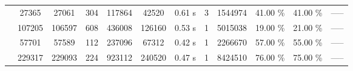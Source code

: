 \begin{table}[ht]
\begin{tabular}{ |c|c|c|c|c|c|c|c|c|c| }
 & 27365 & 27061 & 304 & 117864 & 42520 & 0.61 s & 3 & 1544974 & 41.00 \% & 41.00 \% & ----- \\
 & 107205 & 106597 & 608 & 436008 & 126160 & 0.53 s & 1 & 5015038 & 19.00 \% & 21.00 \% & ----- \\
 & 57701 & 57589 & 112 & 237096 & 67312 & 0.42 s & 1 & 2266670 & 57.00 \% & 55.00 \% & ----- \\
 & 229317 & 229093 & 224 & 923112 & 240520 & 0.47 s & 1 & 8424510 & 76.00 \% & 75.00 \% & ----- \\
\hline
\end{tabular}
\end{table}
